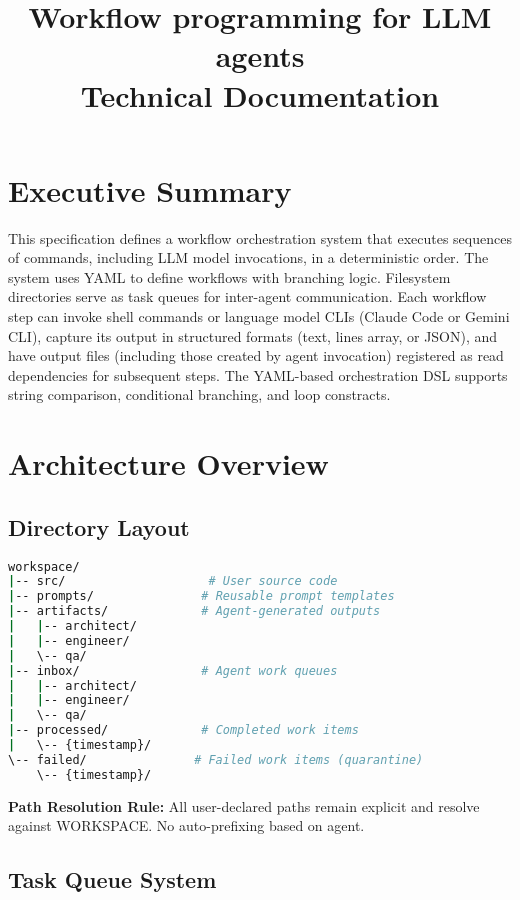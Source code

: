 \documentclass[11pt,a4paper]{article}
\title{\Huge\textbf{Workflow programming for LLM agents}\\[0.5cm]
       \Large Technical Documentation}
\author{}
\begin{document}

\newpage
\tableofcontents
\newpage

\section{Executive Summary}

This specification defines a workflow orchestration system that executes sequences of commands, including LLM model invocations, in a deterministic order. The system uses YAML to define workflows with branching logic. Filesystem directories serve as task queues for inter-agent communication. Each workflow step can invoke shell commands or language model CLIs (Claude Code or Gemini CLI), capture its output in structured formats (text, lines array, or JSON), and have output files (including those created by agent invocation) registered as read dependencies for subsequent steps. The YAML-based orchestration DSL supports string comparison, conditional branching, and loop constracts.

\section{Architecture Overview}

\subsection{Directory Layout}

\begin{lstlisting}[language=bash, caption={Workspace Directory Structure}]
workspace/
|-- src/                    # User source code
|-- prompts/               # Reusable prompt templates
|-- artifacts/             # Agent-generated outputs
|   |-- architect/
|   |-- engineer/
|   \-- qa/
|-- inbox/                 # Agent work queues
|   |-- architect/
|   |-- engineer/
|   \-- qa/
|-- processed/             # Completed work items
|   \-- {timestamp}/
\-- failed/               # Failed work items (quarantine)
    \-- {timestamp}/
\end{lstlisting}

\textbf{Path Resolution Rule:} All user-declared paths remain explicit and resolve against WORKSPACE. No auto-prefixing based on agent.

\subsection{Task Queue System}
\end{document}
